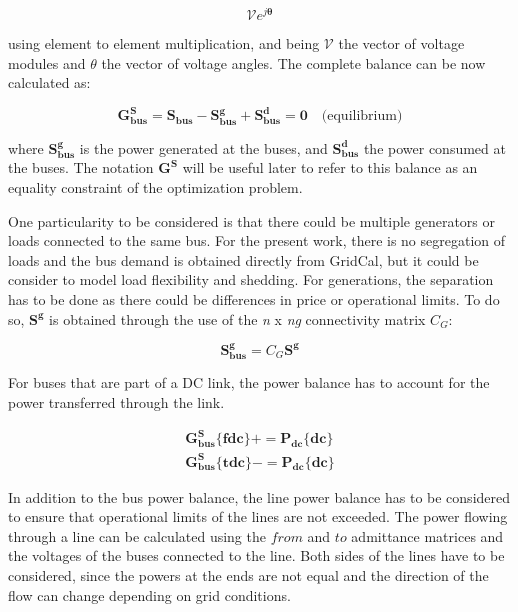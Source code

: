 \begin{equation}
    \bm{\mathcal{V}} e^{j\bm{\theta}} 
\end{equation}

using element to element multiplication, and being $\mathcal{V}$ the vector of voltage modules and $\theta$ the vector of voltage angles. The complete balance can be now calculated as:

\begin{equation}
    \bm{G^{S}_{bus}} = \bm{S_{bus}} - \bm{S_{bus}^{g}} + \bm{S_{bus}^{d}}  = \bm{0} \quad \text{(equilibrium)}
    \label{eq:GSbus} 
\end{equation}

where $\bm{S_{bus}^{g}}$ is the power generated at the buses, and  $\bm{S_{bus}^{d}}$ the power consumed at the buses. The notation $\bm{G^{S}}$ will be useful later to refer to this balance as an equality constraint of the optimization problem.

One particularity to be considered is that there could be multiple generators or loads connected to the same bus. For the present work, there is no segregation of loads and the bus demand is obtained directly from GridCal, but it could be consider
to model load flexibility and shedding. For generations, the separation has to be done as there could be differences in price or operational limits. To do so, $\bm{S^{g}}$ is obtained through the use of the \textit{n} x \textit{ng} connectivity matrix $C_{G}$:

\begin{equation}
    \bm{S_{bus}^{g}} = C_{G} \bm{S^{g}}
    \label{Eq:Gen}
\end{equation}

For buses that are part of a DC link, the power balance has to account for the power transferred through the link.

\newcommand{\pluseq}{\mathrel{{+}{=}}}
\newcommand{\minuseq}{\mathrel{{-}{=}}}

\begin{equation}
    \begin{split}
        \bm{G_{bus}^{S}} \{\bm{fdc}\} \pluseq  \bm{P_{dc}}\{\bm{dc}\} \\
        \bm{G_{bus}^{S}} \{\bm{tdc}\} \minuseq \bm{P_{dc}}\{\bm{dc}\}
    \end{split}
\end{equation}


In addition to the bus power balance, the line power balance has to be considered to ensure that operational limits of the lines are not exceeded. The power
flowing through a line can be calculated using the $from$ and $to$ admittance matrices and the voltages of the buses connected to the line. Both sides of the
lines have to be considered, since the powers at the ends are not equal and the direction of the flow can change depending on grid conditions.

